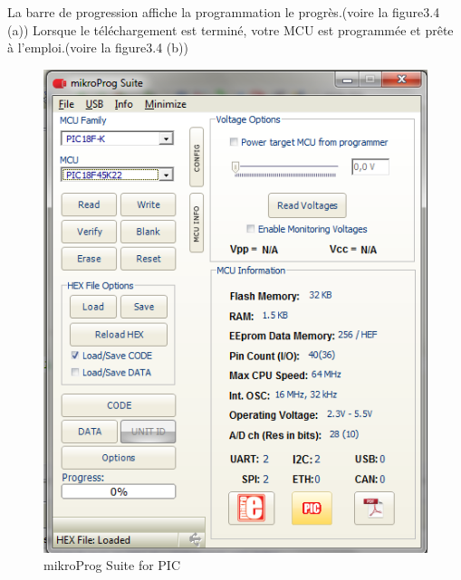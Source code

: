 \documentclass[a4paper, 12pt]{book}
\newcounter{program}[subsection]
\begin{document}
La barre de progression affiche la programmation le progrès.(voire la figure3.4 (a))
Lorsque le téléchargement est terminé, votre MCU est programmée et prête à l’emploi.(voire la figure3.4 (b))\\
\begin{figure}[htbp]
  \centering
  \includegraphics[width=0.5\linewidth]{images/mikroProg_Suite.png}
  \caption{mikroProg Suite for PIC\label{fig-bmp}}
\end{figure} 
\end{document}
